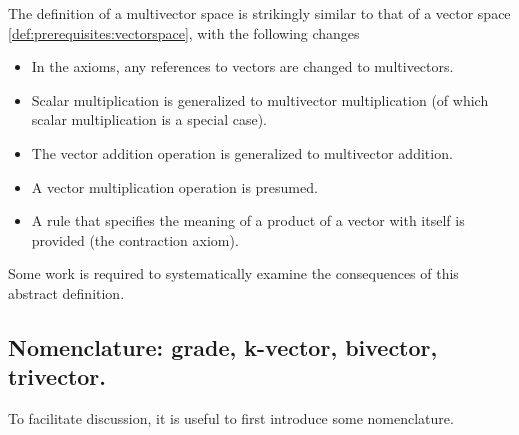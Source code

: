 The definition of a multivector space is strikingly similar to that of a vector space
\cref{def:prerequisites:vectorspace}, with the following changes

\begin{itemize}
\item In the axioms, any references to vectors are changed to multivectors.
\item Scalar multiplication is generalized to multivector multiplication (of which scalar multiplication is a special case).
\item The vector addition operation is generalized to multivector addition.
\item A vector multiplication operation is presumed.
\item A rule that specifies the meaning of a product of a vector with itself is provided (the contraction axiom).
\end{itemize}

Some work is required to systematically examine the consequences of this abstract definition.

\subsection{Nomenclature: grade, k-vector, bivector, trivector.}

To facilitate discussion, it is useful to first introduce some nomenclature.

%


